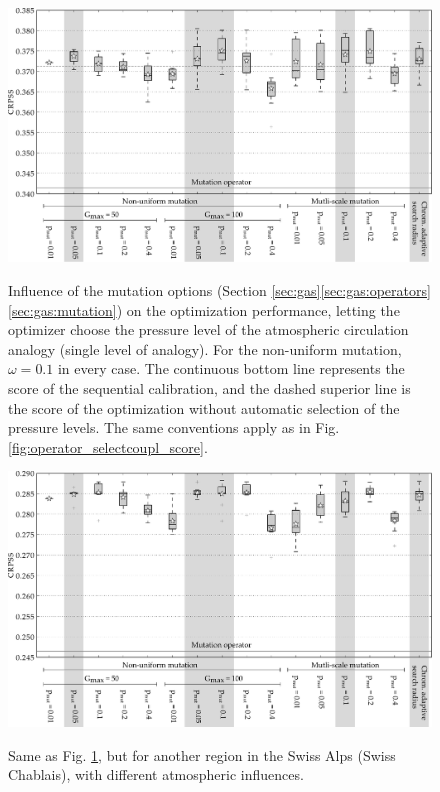\documentclass{ametsoc}
\begin{document}
\begin{figure}[t]
	\begin{center}
		\noindent\includegraphics[width=33pc,angle=0]{fig08.pdf}\\
	\end{center}
	\caption{Influence of the mutation options (Section \ref{sec:gas}\ref{sec:gas:operators}\ref{sec:gas:mutation}) on the optimization performance, letting the optimizer choose the pressure level of the atmospheric circulation analogy (single level of analogy). For the non-uniform mutation, $\omega=0.1$ in every case. The continuous bottom line represents the score of the sequential calibration, and the dashed superior line is the score of the optimization without automatic selection of the pressure levels. The same conventions apply as in Fig. \ref{fig:operator_selectcoupl_score}.}
	\label{fig:operator_mutation_score_atmlevel}
\end{figure}

\begin{figure}[t]
	\begin{center}
		\noindent\includegraphics[width=33pc,angle=0]{fig09.pdf}\\
	\end{center}
	\caption{Same as Fig. \ref{fig:operator_mutation_score_atmlevel}, but for another region in the Swiss Alps (Swiss Chablais), with different atmospheric influences.}
	\label{fig:operator_mutation_score_rhoneamont}
\end{figure}
\end{document}
